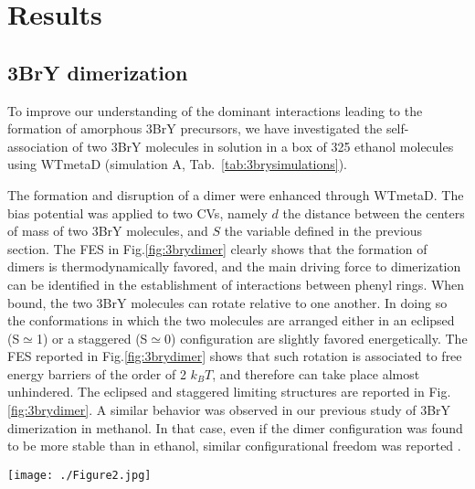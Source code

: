\documentclass[journal=cgdefu,manuscript=article,layout=twocolumn]{achemso}
\begin{document}
\section{Results}
\subsection{3BrY dimerization}

To improve our understanding of the dominant interactions leading to the formation of amorphous 3BrY precursors, we have investigated the self-association of two 3BrY molecules in solution in a box of 325 ethanol molecules using WTmetaD (simulation A, Tab.~\ref{tab:3brysimulations}).

The formation and disruption of a dimer were enhanced through WTmetaD. The bias potential was applied to two CVs, namely $d$ the distance between the centers of mass of two 3BrY molecules, and $S$ the variable defined in the previous section.
The FES in Fig.\ref{fig:3brydimer} clearly shows that the formation of dimers is thermodynamically favored, and the main driving force to dimerization can be identified in the establishment of interactions between phenyl rings.
When bound, the two 3BrY molecules can rotate relative to one another. In doing so the conformations in which the two molecules are arranged either in an eclipsed (S$\simeq${1}) or a staggered (S$\simeq${0}) configuration are slightly favored energetically. The FES reported in Fig.\ref{fig:3brydimer} shows that such rotation is associated to free energy barriers of the order of 2 $k_BT$, and therefore can take place almost unhindered. The eclipsed and staggered limiting structures are reported in Fig. \ref{fig:3brydimer}. 
A similar behavior was observed in our previous study of 3BrY dimerization in methanol. In that case, even if the dimer configuration was found to be more stable than in ethanol, similar configurational freedom was reported \cite{salvalaglio20141}.

\begin{figure*}[ht!]
\centering
\texttt{[image: ./Figure2.jpg]}
\caption{Simulation A. \emph{left}) Two limiting dimer configurations: eclipsed ($\blacktriangle$) and staggered ($\blacksquare$) B) FES associated with the formation of a 3BrY dimer in ethanol solution. The FES illustrates how the dimerization process is favored and the interconversion between different dimer configurations is characterized by a small barrier. This information suggests that 3BrY dimers can reorganize and reorient with small energetic costs, hence on short timescales.}
\label{fig:3brydimer}
\end{figure*}  
\end{document}
